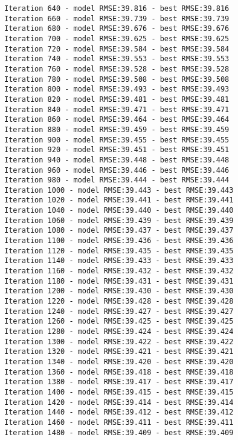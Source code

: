 \documentclass[11pt]{article}
\begin{document}
\begin{Verbatim}[commandchars=\\\{\},fontsize=\small]
Iteration 640 - model RMSE:39.816 - best RMSE:39.816
Iteration 660 - model RMSE:39.739 - best RMSE:39.739
Iteration 680 - model RMSE:39.676 - best RMSE:39.676
Iteration 700 - model RMSE:39.625 - best RMSE:39.625
Iteration 720 - model RMSE:39.584 - best RMSE:39.584
Iteration 740 - model RMSE:39.553 - best RMSE:39.553
Iteration 760 - model RMSE:39.528 - best RMSE:39.528
Iteration 780 - model RMSE:39.508 - best RMSE:39.508
Iteration 800 - model RMSE:39.493 - best RMSE:39.493
Iteration 820 - model RMSE:39.481 - best RMSE:39.481
Iteration 840 - model RMSE:39.471 - best RMSE:39.471
Iteration 860 - model RMSE:39.464 - best RMSE:39.464
Iteration 880 - model RMSE:39.459 - best RMSE:39.459
Iteration 900 - model RMSE:39.455 - best RMSE:39.455
Iteration 920 - model RMSE:39.451 - best RMSE:39.451
Iteration 940 - model RMSE:39.448 - best RMSE:39.448
Iteration 960 - model RMSE:39.446 - best RMSE:39.446
Iteration 980 - model RMSE:39.444 - best RMSE:39.444
Iteration 1000 - model RMSE:39.443 - best RMSE:39.443
Iteration 1020 - model RMSE:39.441 - best RMSE:39.441
Iteration 1040 - model RMSE:39.440 - best RMSE:39.440
Iteration 1060 - model RMSE:39.439 - best RMSE:39.439
Iteration 1080 - model RMSE:39.437 - best RMSE:39.437
Iteration 1100 - model RMSE:39.436 - best RMSE:39.436
Iteration 1120 - model RMSE:39.435 - best RMSE:39.435
Iteration 1140 - model RMSE:39.433 - best RMSE:39.433
Iteration 1160 - model RMSE:39.432 - best RMSE:39.432
Iteration 1180 - model RMSE:39.431 - best RMSE:39.431
Iteration 1200 - model RMSE:39.430 - best RMSE:39.430
Iteration 1220 - model RMSE:39.428 - best RMSE:39.428
Iteration 1240 - model RMSE:39.427 - best RMSE:39.427
Iteration 1260 - model RMSE:39.425 - best RMSE:39.425
Iteration 1280 - model RMSE:39.424 - best RMSE:39.424
Iteration 1300 - model RMSE:39.422 - best RMSE:39.422
Iteration 1320 - model RMSE:39.421 - best RMSE:39.421
Iteration 1340 - model RMSE:39.420 - best RMSE:39.420
Iteration 1360 - model RMSE:39.418 - best RMSE:39.418
Iteration 1380 - model RMSE:39.417 - best RMSE:39.417
Iteration 1400 - model RMSE:39.415 - best RMSE:39.415
Iteration 1420 - model RMSE:39.414 - best RMSE:39.414
Iteration 1440 - model RMSE:39.412 - best RMSE:39.412
Iteration 1460 - model RMSE:39.411 - best RMSE:39.411
Iteration 1480 - model RMSE:39.409 - best RMSE:39.409
    \end{Verbatim}
\end{document}
